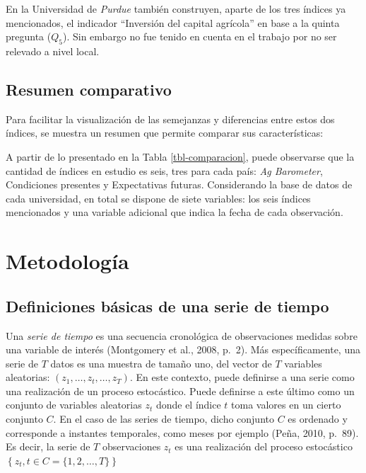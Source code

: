 \documentclass[12pt]{article}
\begin{document}
En la Universidad de \emph{Purdue} también construyen, aparte de los
tres índices ya mencionados, el indicador ``Inversión del capital
agrícola'' en base a la quinta pregunta (\(Q_5\)). Sin embargo no fue
tenido en cuenta en el trabajo por no ser relevado a nivel local.

\newpage

\subsection{Resumen comparativo}\label{resumen-comparativo}

Para facilitar la visualización de las semejanzas y diferencias entre
estos dos índices, se muestra un resumen que permite comparar sus
características:



A partir de lo presentado en la Tabla \ref{tbl-comparacion}, puede
observarse que la cantidad de índices en estudio es seis, tres para cada
país: \emph{Ag Barometer}, Condiciones presentes y Expectativas futuras.
Considerando la base de datos de cada universidad, en total se dispone
de siete variables: los seis índices mencionados y una variable
adicional que indica la fecha de cada observación.

\newpage

\section{Metodología}\label{metodologuxeda}

\subsection{Definiciones básicas de una serie de
tiempo}\label{definiciones-buxe1sicas-de-una-serie-de-tiempo}

Una \emph{serie de tiempo} es una secuencia cronológica de observaciones
medidas sobre una variable de interés (Montgomery et al., 2008, p.~2).
Más específicamente, una serie de \(T\) datos es una muestra de tamaño
uno, del vector de \(T\) variables aleatorias:
\((z_1, \dots, z_t, \dots, z_T)\). En este contexto, puede definirse a
una serie como una realización de un proceso estocástico. Puede
definirse a este último como un conjunto de variables aleatorias
\({z_t}\) donde el índice \(t\) toma valores en un cierto conjunto
\(C\). En el caso de las series de tiempo, dicho conjunto \(C\) es
ordenado y corresponde a instantes temporales, como meses por ejemplo
(Peña, 2010, p.~89). Es decir, la serie de \(T\) observaciones \(z_t\)
es una realización del proceso estocástico
\(\left\{z_t, t \in C = \{1, 2, \dots, T\}\right\}\)
\end{document}
